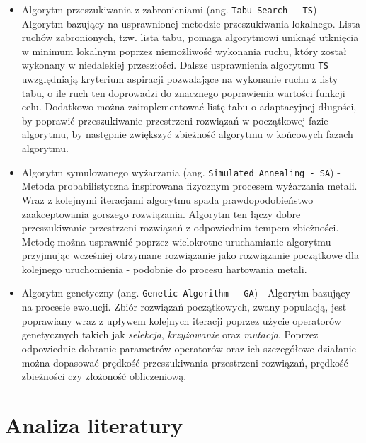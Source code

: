 \begin{itemize}
    \item Algorytm przeszukiwania z zabronieniami (ang. \texttt{Tabu Search - TS}) - Algorytm bazujący na usprawnionej metodzie przeszukiwania lokalnego. Lista ruchów zabronionych, tzw. lista tabu, pomaga algorytmowi uniknąć utknięcia w minimum lokalnym poprzez niemożliwość wykonania ruchu, który został wykonany w niedalekiej przeszłości. Dalsze usprawnienia algorytmu \texttt{TS} uwzględniają kryterium aspiracji pozwalające na wykonanie ruchu z listy tabu, o ile ruch ten doprowadzi do znacznego poprawienia wartości funkcji celu. Dodatkowo można zaimplementować listę tabu o adaptacyjnej długości, by poprawić przeszukiwanie przestrzeni rozwiązań w początkowej fazie algorytmu, by następnie zwiększyć zbieżność algorytmu w końcowych fazach algorytmu.
    \item Algorytm symulowanego wyżarzania (ang. \texttt{Simulated Annealing - SA}) - Metoda probabilistyczna inspirowana fizycznym procesem wyżarzania metali. Wraz z kolejnymi iteracjami algorytmu spada prawdopodobieństwo zaakceptowania gorszego rozwiązania. Algorytm ten łączy dobre przeszukiwanie przestrzeni rozwiązań z odpowiednim tempem zbieżności. Metodę można usprawnić poprzez wielokrotne uruchamianie algorytmu przyjmując wcześniej otrzymane rozwiązanie jako rozwiązanie początkowe dla kolejnego uruchomienia - podobnie do procesu hartowania metali.
    \item Algorytm genetyczny (ang. \texttt{Genetic Algorithm - GA}) - Algorytm bazujący na procesie ewolucji. Zbiór rozwiązań początkowych, zwany populacją, jest poprawiany wraz z upływem kolejnych iteracji poprzez użycie operatorów genetycznych takich jak \textit{selekcja}, \textit{krzyżowanie} oraz \textit{mutacja}. Poprzez odpowiednie dobranie parametrów operatorów oraz ich szczegółowe działanie można dopasować prędkość przeszukiwania przestrzeni rozwiązań, prędkość zbieżności czy złożoność obliczeniową.
\end{itemize}

\section{Analiza literatury}









